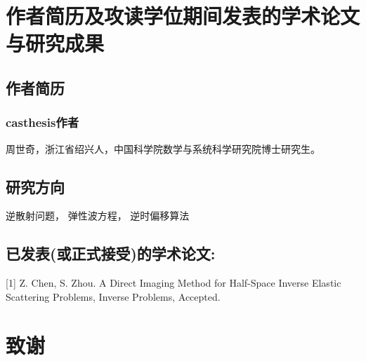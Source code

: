 \chapter{作者简历及攻读学位期间发表的学术论文与研究成果}



\section*{作者简历}

\subsection*{casthesis作者}

周世奇，浙江省绍兴人，中国科学院数学与系统科学研究院博士研究生。

\section*{研究方向}

逆散射问题， 弹性波方程， 逆时偏移算法


\section*{已发表(或正式接受)的学术论文:}

[1] Z. Chen, S. Zhou. A Direct Imaging Method for Half-Space Inverse
Elastic Scattering Problems, Inverse Problems, Accepted.



\chapter[致谢]{致\quad 谢}%
\thispagestyle{noheaderstyle}%



\cleardoublepage[plain]%

